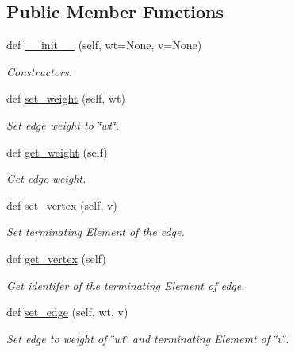 \subsection*{Public Member Functions}
\begin{DoxyCompactItemize}
\item 
def \mbox{\hyperlink{class_bridges_1_1edge_1_1_edge_a312209cb99ae753de7ad34818b095dfc}{\+\_\+\+\_\+init\+\_\+\+\_\+}} (self, wt=None, v=None)
\begin{DoxyCompactList}\small\item\em Constructors. \end{DoxyCompactList}\item 
def \mbox{\hyperlink{class_bridges_1_1edge_1_1_edge_a6e6cd15ddf1a1550edbdcc947b8bf52c}{set\+\_\+weight}} (self, wt)
\begin{DoxyCompactList}\small\item\em Set edge weight to \char`\"{}wt\char`\"{}. \end{DoxyCompactList}\item 
def \mbox{\hyperlink{class_bridges_1_1edge_1_1_edge_a014aeea3de184a001bc0dec8c4c76189}{get\+\_\+weight}} (self)
\begin{DoxyCompactList}\small\item\em Get edge weight. \end{DoxyCompactList}\item 
def \mbox{\hyperlink{class_bridges_1_1edge_1_1_edge_a8d8d9c805341d0d6dd45210d740d7de1}{set\+\_\+vertex}} (self, v)
\begin{DoxyCompactList}\small\item\em Set terminating Element of the edge. \end{DoxyCompactList}\item 
def \mbox{\hyperlink{class_bridges_1_1edge_1_1_edge_a68e890b1ad5a01ef69bee809b7b526d1}{get\+\_\+vertex}} (self)
\begin{DoxyCompactList}\small\item\em Get identifer of the terminating Element of edge. \end{DoxyCompactList}\item 
def \mbox{\hyperlink{class_bridges_1_1edge_1_1_edge_aa65288b314e414374bc3d2e0a0792c03}{set\+\_\+edge}} (self, wt, v)
\begin{DoxyCompactList}\small\item\em Set edge to weight of \char`\"{}wt\char`\"{} and terminating Elememt of \char`\"{}v\char`\"{}. \end{DoxyCompactList}\item 

\end{DoxyCompactItemize}
